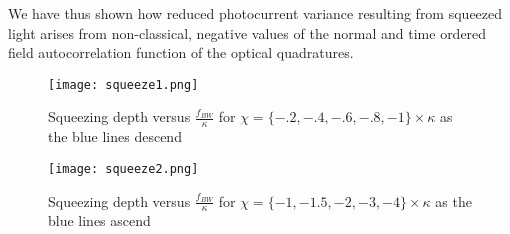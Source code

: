 \documentclass[12pt]{article}
\begin{document}
We have thus shown how reduced photocurrent variance resulting from squeezed light arises from non-classical, negative values of the normal and time ordered field autocorrelation function of the optical quadratures.

\begin{figure}[b]
	\centering
	\texttt{[image: squeeze1.png]}
	\caption{Squeezing depth versus $\frac{f_{BW}}{\kappa}$ for $\chi = \{-.2, -.4, -.6, -.8, -1\} \times \kappa$ as the blue lines descend}
\end{figure}

\begin{figure}[b]
	\centering
	\texttt{[image: squeeze2.png]}
	\caption{Squeezing depth versus $\frac{f_{BW}}{\kappa}$ for $\chi = \{-1, -1.5, -2, -3, -4\} \times \kappa$ as the blue lines ascend}
\end{figure}
\end{document}
